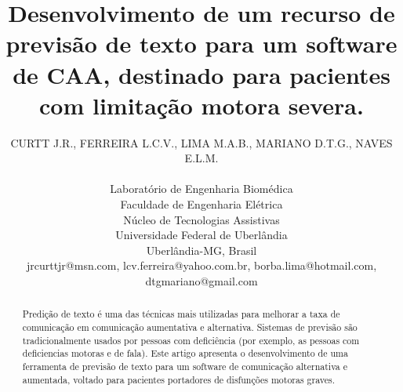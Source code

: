 \documentclass[twoside]{article}
\title{\vspace{-15mm}\fontsize{24pt}{10pt}\selectfont\textbf{Desenvolvimento de um recurso de previsão de texto para um software de CAA, destinado para pacientes com limitação motora severa.}} %
\author{
\large
\textsc{CURTT J.R., FERREIRA L.C.V., LIMA M.A.B., MARIANO D.T.G., NAVES E.L.M.}\\[2mm] %
\normalsize \\Laboratório de Engenharia Biomédica \\Faculdade de Engenharia Elétrica \\Núcleo de Tecnologias Assistivas \\Universidade Federal de Uberlândia\\ \normalsize Uberlândia-MG, Brasil \\ %
\normalsize {jrcurttjr@msn.com, lcv.ferreira@yahoo.com.br, borba.lima@hotmail.com, dtgmariano@gmail.com}
\vspace{-5mm}
}
\date{}
\begin{document}
\maketitle %
\thispagestyle{fancy} %



\begin{abstract}
\noindent
Predição de texto é uma das técnicas mais utilizadas para melhorar a taxa de comunicação em comunicação aumentativa e alternativa. Sistemas de previsão são tradicionalmente usados por pessoas com deficiência (por exemplo, as pessoas com deficiencias motoras e de fala). Este artigo apresenta o desenvolvimento de uma ferramenta de previsão de texto para um software de comunicação alternativa e aumentada, voltado para pacientes portadores de disfunções motoras graves.
\end{abstract}

\end{document}

